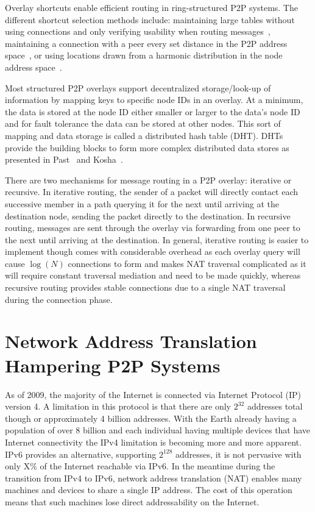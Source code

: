 Overlay shortcuts enable efficient routing in ring-structured P2P systems.  The
different shortcut selection methods include: maintaining large tables without
using connections and only verifying usability when routing
messages~\cite{pastry, kademlia}, maintaining a connection with a peer every
set distance in the P2P address space~\cite{chord}, or using locations drawn
from a harmonic distribution in the node address space~\cite{symphony}.

Most structured P2P overlays support decentralized storage/look-up of information by
mapping keys to specific node IDs in an overlay.  At a minimum, the data is stored
at the node ID either smaller or larger to the data's node ID and for fault
tolerance the data can be stored at other nodes.  This sort of mapping
and data storage is called a distributed hash table (DHT).  DHTs provide the
building blocks to form more complex distributed data stores as presented in
Past~\cite{past} and Kosha~\cite{kosha}.

There are two mechanisms for message routing in a P2P overlay: iterative or
recursive.  In iterative routing, the sender of a packet will directly contact
each successive member in a path querying it for the next until arriving at the
destination node, sending the packet directly to the destination.  In recursive
routing, messages are sent through the overlay via forwarding from one peer to
the next until arriving at the destination.  In general, iterative routing is
easier to implement though comes with considerable overhead as each overlay
query will cause $\log(N)$ connections to form and makes NAT traversal
complicated as it will require constant traversal mediation and need to be made
quickly, whereas recursive routing provides stable connections due to a single
NAT traversal during the connection phase.

\section{Network Address Translation Hampering P2P Systems}
As of 2009, the majority of the Internet is connected via Internet Protocol (IP)
version 4.  A limitation in this protocol is that there are only $2^{32}$
addresses total though or approximately 4 billion addresses.  With the
Earth already having a population of over 8 billion and each individual having
multiple devices that have Internet connectivity the IPv4 limitation is becoming
more and more apparent.  IPv6 provides an alternative, supporting $2^{128}$
addresses, it is not pervasive with only X\% of the Internet reachable via IPv6. 
In the meantime during the transition from IPv4 to IPv6, network address
translation (NAT) enables many machines and devices to share a single IP
address.  The cost of this operation means that such machines lose direct
addressability on the Internet.

